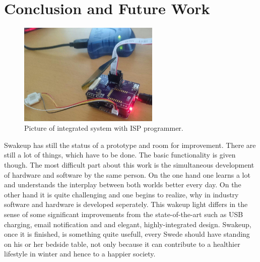 \chapter{Conclusion and Future Work}
\label{chap:conclusion}
\begin{figure}[H] 
	\centering 
	\label{fig:demo}
	\includegraphics[width=0.6\textwidth]{./fig/demo.jpg}
	\caption{Picture of integrated system with ISP programmer.} 
\end{figure} Swakeup has still the
status of a prototype and room for improvement. There are
still a lot of things, which have to be done. The basic functionality is given
though. The most difficult part about this work is the simultaneous
development of hardware and software by the same person. On the one hand one
learns a lot and understands the interplay between both worlds better every day. On
the other hand it is quite challenging and one begins to realize, why
in industry software and hardware is developed seperately.  \newpar This wakeup
light differs in the sense of some significant improvements from the
state-of-the-art such as USB charging, email notification and and elegant,
highly-integrated design. Swakeup, once it is finished, is something quite
usefull, every Swede should have standing on his or her bedside table, not only because it can contribute to a healthier lifestyle in winter and hence to a happier society. 
